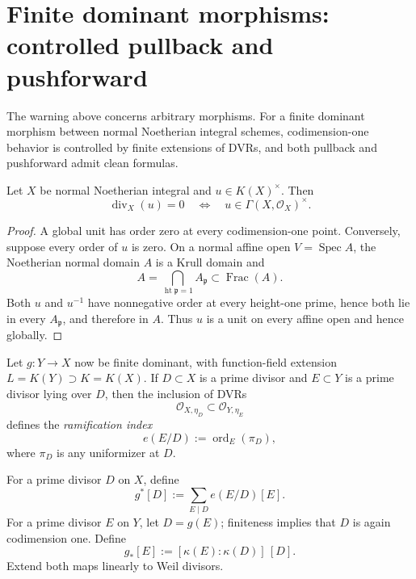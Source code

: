 \section{Finite dominant morphisms: controlled pullback and pushforward}\label{sec:vi39-finite-morphism-divisors}
The warning above concerns arbitrary morphisms.  For a finite dominant morphism between normal Noetherian integral schemes, codimension-one behavior is controlled by finite extensions of DVRs, and both pullback and pushforward admit clean formulas.

\begin{proposition}\label{prop:vi39-zero-divisor-unit}
Let \(X\) be normal Noetherian integral and \(u\in K(X)^\times\).  Then
\[
 \operatorname{div}_X(u)=0
 \quad\Longleftrightarrow\quad
 u\in\Gamma(X,\mathcal O_X)^\times.
\]
\end{proposition}

\begin{proof}
A global unit has order zero at every codimension-one point.  Conversely, suppose every order of \(u\) is zero.  On a normal affine open \(V=\operatorname{Spec}A\), the Noetherian normal domain \(A\) is a Krull domain and
\[
 A=\bigcap_{\operatorname{ht}\mathfrak p=1}A_{\mathfrak p}
 \subset\operatorname{Frac}(A).
\]
Both \(u\) and \(u^{-1}\) have nonnegative order at every height-one prime, hence both lie in every \(A_{\mathfrak p}\), and therefore in \(A\).  Thus \(u\) is a unit on every affine open and hence globally.
\end{proof}

Let \(g:Y\to X\) now be finite dominant, with function-field extension \(L=K(Y)\supset K=K(X)\).  If \(D\subset X\) is a prime divisor and \(E\subset Y\) is a prime divisor lying over \(D\), then the inclusion of DVRs
\[
 \mathcal O_{X,\eta_D}\subset\mathcal O_{Y,\eta_E}
\]
defines the \emph{ramification index}
\[
 e(E/D):=\operatorname{ord}_E(\pi_D),
\]
where \(\pi_D\) is any uniformizer at \(D\).

\begin{definition}\label{def:vi39-finite-pull-push}
For a prime divisor \(D\) on \(X\), define
\[
 g^*[D]:=\sum_{E\mid D}e(E/D)[E].
\]
For a prime divisor \(E\) on \(Y\), let \(D=g(E)\); finiteness implies that \(D\) is again codimension one.  Define
\[
 g_*[E]:=[\kappa(E):\kappa(D)]\,[D].
\]
Extend both maps linearly to Weil divisors.
\end{definition}

